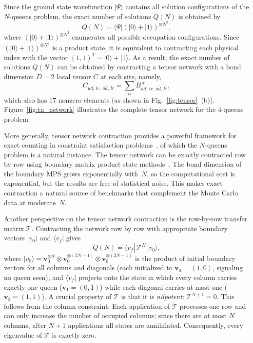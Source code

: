 \documentclass[aps, pre, reprint, amsmath, amssymb, superscriptaddress, floatfix]{revtex4-2}
\begin{document}
Since the ground state wavefunction $|\Psi \rangle$ contains all solution 
configurations of the $N$-queens problem, the exact number of solutions $Q(N)$ 
is obtained by 
\begin{equation}
Q(N) = \langle \Psi | (|0 \rangle +  |1 \rangle)^{\otimes N^2},
\end{equation}
where $(|0 \rangle +  |1 \rangle)^{\otimes N^2}$ enumerates all possible 
occupation configurations. Since $(|0 \rangle +  |1 \rangle)^{\otimes N^2}$ 
is a product state, it is equivalent to contracting each physical index with 
the vector $(1,1)^T = |0\rangle + |1\rangle$. As a result, the exact number
of solutions $Q(N)$ can be obtained by contracting a tensor network with a 
bond dimension $D=2$ local tensor $C$ at each site, namely,
\begin{equation}
  C_{ud,\,lr,\,\bar{u}\bar{d},\,\bar{l}\bar{r}} = \sum_{\alpha} B_{ud,\,lr,\,\bar{u}\bar{d},\,\bar{l}\bar{r}}^{\,\alpha},
   \label{eq:Ctensor}
  \end{equation}
 which also has 17 nonzero elements (as shown in Fig.~\ref{fig:tensor}~(b)).
Figure~\ref{fig:tn_network} illustrates the complete tensor network for 
the 4-queens problem.

More generally, tensor network contraction provides a powerful
framework for exact counting in constraint satisfaction
problems~\cite{Kourtis2019,Vanderstraeten2018}, of which the $N$-queens problem is a
natural instance.
The tensor network can be exactly contracted row by row using
boundary matrix product state methods~\cite{Xiang2024}.  The bond
dimension of the boundary MPS grows exponentially with~$N$, so the
computational cost is exponential, but the results are free of
statistical noise.  This makes exact contraction a natural source of
benchmarks that complement the Monte Carlo data at moderate~$N$.

Another perspective on the tensor network contraction is the
row-by-row transfer matrix $\mathcal{T}$.  Contracting the network
row by row with appropriate boundary vectors $|v_0\rangle$ and
$\langle v_f|$ gives
\begin{equation}
  Q(N) = \langle v_f |\,\mathcal{T}^N\,| v_0 \rangle,
\end{equation}
where $|v_0\rangle = \mathbf{v}_0^{\otimes N} \otimes
\mathbf{v}_0^{\otimes (2N-1)} \otimes \mathbf{v}_0^{\otimes (2N-1)}$
is the product of initial boundary vectors for all columns and
diagonals (each initialized to $\mathbf{v}_0 = (1,0)$, signaling no
queen seen), and $\langle v_f|$ projects onto the state in which every
column carries exactly one queen ($\mathbf{v}_1 = (0,1)$) while each
diagonal carries at most one ($\mathbf{v}_2 = (1,1)$).
A crucial property of $\mathcal{T}$ is that it is
\emph{nilpotent}: $\mathcal{T}^{N+1} = 0$.
This follows from the column constraint.  Each application of
$\mathcal{T}$ processes one row and can only increase the number of
occupied columns; since there are at most $N$ columns, after $N+1$
applications all states are annihilated.  Consequently, every
eigenvalue of $\mathcal{T}$ is exactly zero.
\end{document}
